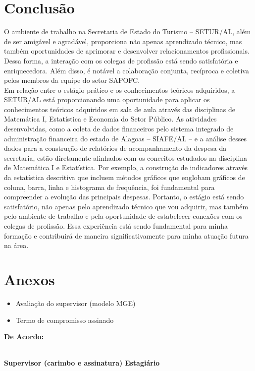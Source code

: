 \documentclass[12pt,a4paper]{article}
\begin{document}
	\section{Conclusão}
\hspace*{1,5cm}O ambiente de trabalho na Secretaria de Estado do Turismo – SETUR/AL, além de ser 
amigável e agradável, proporciona não apenas aprendizado técnico, mas também oportunidades 
de aprimorar e desenvolver relacionamentos profissionais. Dessa forma, a interação com os 
colegas de profissão está sendo satisfatória e enriquecedora. Além disso, é notável a 
colaboração conjunta, recíproca e coletiva pelos membros da equipe do setor SAPOFC.\\
\hspace*{1,5cm}Em relação entre o estágio prático e os conhecimentos teóricos adquiridos, a SETUR/AL 
está proporcionando uma oportunidade para aplicar os conhecimentos teóricos adquiridos em 
sala de aula através das disciplinas de Matemática I, Estatística e Economia do Setor Público. 
As atividades desenvolvidas, como a coleta de dados financeiros pelo sistema integrado de 
administração financeira do estado de Alagoas – SIAFE/AL – e a análise desses dados para a 
construção de relatórios de acompanhamento da despesa da secretaria, estão diretamente 
alinhados com os conceitos estudados na disciplina de Matemática I e Estatística. Por exemplo, 
a construção de indicadores através da estatística descritiva que incluem métodos gráficos que 
englobam gráficos de coluna, barra, linha e histograma de frequência, foi fundamental para 
compreender a evolução das principais despesas. Portanto, o estágio está sendo satisfatório, não 
apenas pelo aprendizado técnico que vou adquirir, mas também pelo ambiente de trabalho e 
pela oportunidade de estabelecer conexões com os colegas de profissão. Essa experiência está 
sendo fundamental para minha formação e contribuirá de maneira significativamente para 
minha atuação futura na área.
	
	\section{Anexos}
	
	\begin{itemize}
		\item Avaliação do supervisor (modelo MGE)
		\item Termo de compromisso assinado
	\end{itemize}
	
	\vspace{2cm}
	\noindent \textbf{De Acordo:}
	
	\vspace{2cm}
	\noindent \underline{\hspace{7cm}} \hfill \underline{\hspace{7cm}} \\
	\textbf{Supervisor (carimbo e assinatura)} \hfill \textbf{Estagiário}
	
\end{document}
